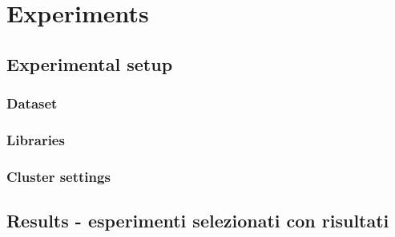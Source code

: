 \documentclass[\main/main.tex]{subfiles}
\begin{document}
\chapter{Experiments}
\section{Experimental setup}
\subsection{Dataset}
\subsection{Libraries}
\subsection{Cluster settings}
\section{Results - esperimenti selezionati con risultati}
\end{document}
